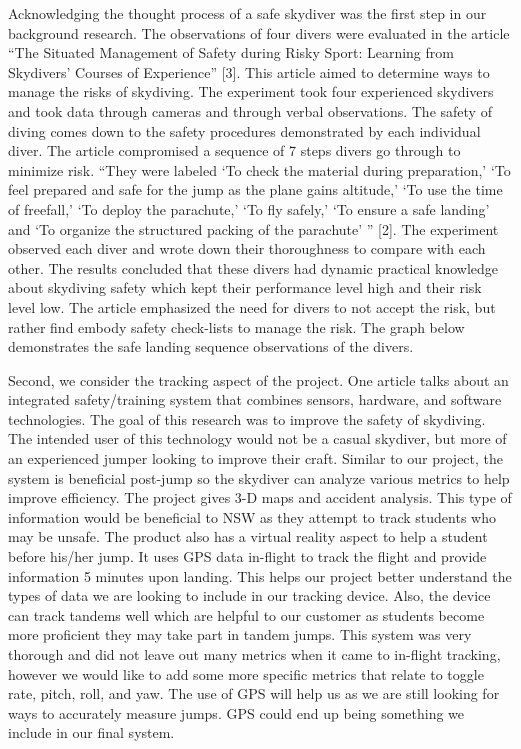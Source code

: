 \documentclass[10pt]{article}
\begin{document}
Acknowledging the thought process of a safe skydiver was the first step in our background research. The observations of four divers were evaluated in the article ``The Situated Management of Safety during Risky Sport: Learning from Skydivers’ Courses of Experience'' [3]. This article aimed to determine ways to manage the risks of skydiving. The experiment took four experienced skydivers and took data through cameras and through verbal observations. The safety of diving comes down to the safety procedures demonstrated by each individual diver. The article compromised a sequence of 7 steps divers go through to minimize risk. ``They were labeled `To check the material during preparation,' `To feel prepared and safe for the jump as the plane gains altitude,' `To use the time of freefall,' `To deploy the parachute,' `To fly safely,' `To ensure a safe landing' and `To organize the structured packing of the parachute' '' [2]. The experiment observed each diver and wrote down their thoroughness to compare with each other. The results concluded that these divers had dynamic practical knowledge about skydiving safety which kept their performance level high and their risk level low. The article emphasized the need for divers to not accept the risk, but rather find embody safety check-lists to manage the risk. The graph below demonstrates the safe landing sequence observations of the divers.

Second, we consider the tracking aspect of the project. One article talks about an integrated safety/training system that combines sensors, hardware, and software technologies. The goal of this research was to improve the safety of skydiving. The intended user of this technology would not be a casual skydiver, but more of an experienced jumper looking to improve their craft. Similar to our project, the system is beneficial post-jump so the skydiver can analyze various metrics to help improve efficiency. The project gives 3-D maps and accident analysis. This type of information would be beneficial to NSW as they attempt to track students who may be unsafe. The product also has a virtual reality aspect to help a student before his/her jump. It uses GPS data in-flight to track the flight and provide information 5 minutes upon landing. This helps our project better understand the types of data we are looking to include in our tracking device. Also, the device can track tandems well which are helpful to our customer as students become more proficient they may take part in tandem jumps. This system was very thorough and did not leave out many metrics when it came to in-flight tracking, however we would like to add some more specific metrics that relate to toggle rate, pitch, roll, and yaw. The use of GPS will help us as we are still looking for ways to accurately measure jumps. GPS could end up being something we include in our final system.
\end{document}

